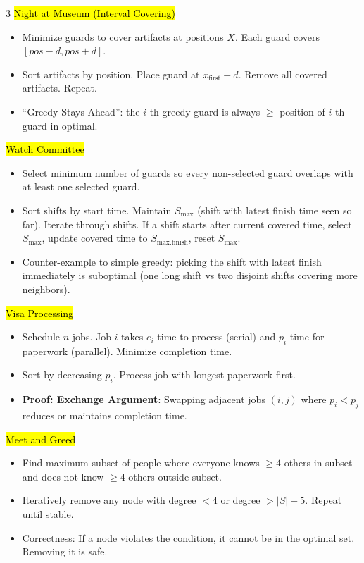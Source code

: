 \documentclass[letterpaper]{article}
\begin{document}
\begin{multicols*}{3}
    \hl{Night at Museum (Interval Covering)}
    \begin{itemize}
        \item Minimize guards to cover artifacts at positions $X$. Each guard covers $[pos-d, pos+d]$.
        \item Sort artifacts by position. Place guard at $x_\text{first} + d$. Remove all covered artifacts. Repeat.
        \item ``Greedy Stays Ahead'': the $i$-th greedy guard is always $\ge$ position of $i$-th guard in optimal.
    \end{itemize}

    \hl{Watch Committee}
    \begin{itemize}
        \item Select minimum number of guards so every non-selected guard overlaps with at least one selected guard.
        \item Sort shifts by start time. Maintain $S_\text{max}$ (shift with latest finish time seen so far). Iterate through shifts. If a shift starts after current covered time, select $S_\text{max}$, update covered time to $S_\text{max.finish}$, reset $S_\text{max}$.
        \item Counter-example to simple greedy: picking the shift with latest finish immediately is suboptimal (one long shift vs two disjoint shifts covering more neighbors).
    \end{itemize}

    \hl{Visa Processing}
    \begin{itemize}
        \item Schedule $n$ jobs. Job $i$ takes $e_i$ time to process (serial) and $p_i$ time for paperwork (parallel). Minimize completion time.
        \item Sort by decreasing $p_i$. Process job with longest paperwork first.
        \item \textbf{Proof: Exchange Argument}: Swapping adjacent jobs $(i,j)$ where $p_i < p_j$ reduces or maintains completion time.
    \end{itemize}

    \hl{Meet and Greed}
    \begin{itemize}
        \item Find maximum subset of people where everyone knows $\ge 4$ others in subset and does not know $\ge 4$ others outside subset.
        \item Iteratively remove any node with degree $<4$ or degree $>|S|-5$. Repeat until stable.
        \item Correctness: If a node violates the condition, it cannot be in the optimal set. Removing it is safe.
    \end{itemize}


\end{multicols*}
\end{document}
